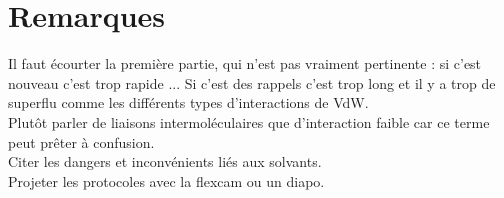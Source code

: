 \documentclass[12pt,prb,aps,epsf]{article}
\begin{document}
\section*{Remarques}
Il faut écourter la première partie, qui n'est pas vraiment pertinente : si c'est nouveau c'est trop rapide ... Si c'est des rappels c'est trop long et il y a trop de superflu comme les différents types d'interactions de VdW.\\

Plutôt parler de liaisons intermoléculaires que d'interaction faible car ce terme peut prêter à confusion.\\

Citer les dangers et inconvénients liés aux solvants.\\

Projeter les protocoles avec la flexcam ou un diapo.
\end{document}
